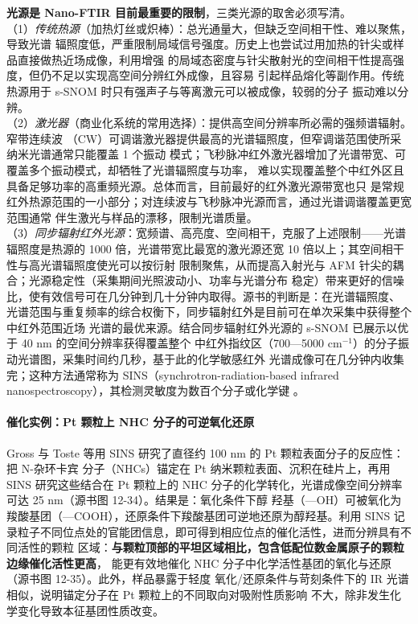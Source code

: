 \begin{measure}
\textbf{光源是 Nano-FTIR 目前最重要的限制}，三类光源的取舍必须写清。\\
（1）\emph{传统热源}（加热灯丝或炽棒）：总光通量大，但缺乏空间相干性、难以聚焦，导致光谱
辐照度低，严重限制局域信号强度。历史上也尝试过用加热的针尖或样品直接做热近场成像，利用增强
的局域态密度与针尖散射光的空间相干性提高强度，但仍不足以实现高空间分辨红外成像，且容易
引起样品熔化等副作用。传统热源用于 s-SNOM 时只有强声子与等离激元可以被成像，较弱的分子
振动难以分辨。\\
（2）\emph{激光器}（商业化系统的常用选择）：提供高空间分辨率所必需的强频谱辐射。窄带连续波
（CW）可调谐激光器提供最高的光谱辐照度，但窄调谐范围使所采纳米光谱通常只能覆盖 1 个振动
模式；飞秒脉冲红外激光器增加了光谱带宽、可覆盖多个振动模式，却牺牲了光谱辐照度与功率，
难以实现覆盖整个中红外区且具备足够功率的高重频光源。总体而言，目前最好的红外激光源带宽也只
是常规红外热源范围的一小部分；对连续波与飞秒脉冲光源而言，通过光谱调谐覆盖更宽范围通常
伴生激光与样品的漂移，限制光谱质量。\\
（3）\emph{同步辐射红外光源}：宽频谱、高亮度、空间相干，克服了上述限制——光谱辐照度是热源的
1000 倍，光谱带宽比最宽的激光源还宽 10 倍以上；其空间相干性与高光谱辐照度使光可以按衍射
限制聚焦，从而提高入射光与 AFM 针尖的耦合；光源稳定性（采集期间光照波动小、功率与光谱分布
稳定）带来更好的信噪比，使有效信号可在几分钟到几十分钟内取得。源书的判断是：在光谱辐照度、
光谱范围与重复频率的综合权衡下，同步辐射红外是目前可在单次采集中获得整个中红外范围近场
光谱的最优来源。结合同步辐射红外光源的 s-SNOM 已展示以优于 40 nm 的空间分辨率获得覆盖整个
中红外指纹区（700—5000 cm$^{-1}$）的分子振动光谱图，采集时间约几秒，基于此的化学敏感红外
光谱成像可在几分钟内收集完；这种方法通常称为 SINS（synchrotron-radiation-based infrared
nanospectroscopy），其检测灵敏度为数百个分子或化学键
。
\end{measure}

\paragraph{催化实例：Pt 颗粒上 NHC 分子的可逆氧化还原}
Gross 与 Toste 等用 SINS 研究了直径约 100 nm 的 Pt 颗粒表面分子的反应性：把 N-杂环卡宾
分子（NHCs）锚定在 Pt 纳米颗粒表面、沉积在硅片上，再用 SINS 研究这些结合在 Pt 颗粒上的
NHC 分子的化学转化，光谱成像空间分辨率可达 25 nm（源书图 12-34）。结果是：氧化条件下醇
羟基（—OH）可被氧化为羧酸基团（—COOH），还原条件下羧酸基团可逆地还原为醇羟基。利用 SINS
记录粒子不同位点处的官能团信息，即可得到相应位点的催化活性，进而分辨具有不同活性的颗粒
区域：\textbf{与颗粒顶部的平坦区域相比，包含低配位数金属原子的颗粒边缘催化活性更高}，
能更有效地催化 NHC 分子中化学活性基团的氧化与还原（源书图 12-35）。此外，样品暴露于轻度
氧化/还原条件与苛刻条件下的 IR 光谱相似，说明锚定分子在 Pt 颗粒上的不同取向对吸附性质影响
不大，除非发生化学变化导致本征基团性质改变。

